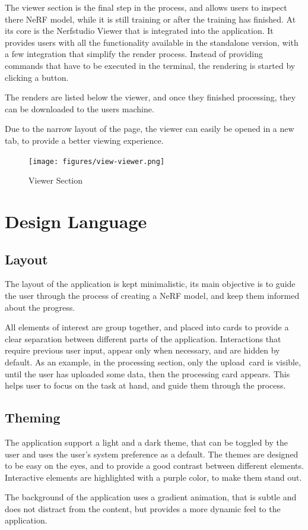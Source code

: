 The viewer section is the final step in the process, and allows users to inspect there NeRF model, while it is still training or after the training has finished.
At its core is the Nerfstudio Viewer that is integrated into the application. 
It provides users with all the functionality available in the standalone version, with a few integration that simplify the render process.
Instead of providing commands that have to be executed in the terminal, the rendering is started by clicking a button.

The renders are listed below the viewer, and once they finished processing, they can be downloaded to the users machine.

Due to the narrow layout of the page, the viewer can easily be opened in a new tab, to provide a better viewing experience.

\begin{figure}[htb]
  \texttt{[image: figures/view-viewer.png]}
  \caption{Viewer Section}
  \label{fig:design:viewer-section}
\end{figure}

\section{Design Language}

\subsection*{Layout}

The layout of the application is kept minimalistic, its main objective is to guide the user through the process of creating a NeRF model, and keep them informed about the progress.

All elements of interest are group together, and placed into cards to provide a clear separation between different parts of the application.
Interactions that require previous user input, appear only when necessary, and are hidden by default.
As an example, in the processing section, only the upload card is visible, until the user has uploaded some data, then the processing card appears.
This helps user to focus on the task at hand, and guide them through the process.

\subsection*{Theming}

The application support a light and a dark theme, that can be toggled by the user and uses the user's system preference as a default.
The themes are designed to be easy on the eyes, and to provide a good contrast between different elements.
Interactive elements are highlighted with a purple color, to make them stand out.

The background of the application uses a gradient animation, that is subtle and does not distract from the content, but provides a more dynamic feel to the application.

